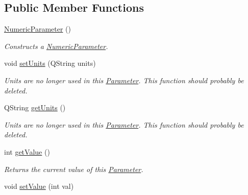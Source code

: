\subsection*{Public Member Functions}
\begin{DoxyCompactItemize}
\item 
\hyperlink{class_picto_1_1_numeric_parameter_a8115bd2ffae7f9a5b2db777ad606eee1}{Numeric\-Parameter} ()
\begin{DoxyCompactList}\small\item\em Constructs a \hyperlink{class_picto_1_1_numeric_parameter}{Numeric\-Parameter}. \end{DoxyCompactList}\item 
\hypertarget{class_picto_1_1_numeric_parameter_aa6545295af97b9260d75a93defbb22b8}{void \hyperlink{class_picto_1_1_numeric_parameter_aa6545295af97b9260d75a93defbb22b8}{set\-Units} (Q\-String units)}\label{class_picto_1_1_numeric_parameter_aa6545295af97b9260d75a93defbb22b8}

\begin{DoxyCompactList}\small\item\em Units are no longer used in this \hyperlink{class_picto_1_1_parameter}{Parameter}. This function should probably be deleted. \end{DoxyCompactList}\item 
\hypertarget{class_picto_1_1_numeric_parameter_a2709725f4142f06214bae4d7d38cc683}{Q\-String \hyperlink{class_picto_1_1_numeric_parameter_a2709725f4142f06214bae4d7d38cc683}{get\-Units} ()}\label{class_picto_1_1_numeric_parameter_a2709725f4142f06214bae4d7d38cc683}

\begin{DoxyCompactList}\small\item\em Units are no longer used in this \hyperlink{class_picto_1_1_parameter}{Parameter}. This function should probably be deleted. \end{DoxyCompactList}\item 
\hypertarget{class_picto_1_1_numeric_parameter_a633886f712afb51964363a379fcb6e7e}{int \hyperlink{class_picto_1_1_numeric_parameter_a633886f712afb51964363a379fcb6e7e}{get\-Value} ()}\label{class_picto_1_1_numeric_parameter_a633886f712afb51964363a379fcb6e7e}

\begin{DoxyCompactList}\small\item\em Returns the current value of this \hyperlink{class_picto_1_1_parameter}{Parameter}. \end{DoxyCompactList}\item 
\hypertarget{class_picto_1_1_numeric_parameter_a99292e7d51401b4233d4237dee219280}{void \hyperlink{class_picto_1_1_numeric_parameter_a99292e7d51401b4233d4237dee219280}{set\-Value} (int val)}\label{class_picto_1_1_numeric_parameter_a99292e7d51401b4233d4237dee219280}


\end{DoxyCompactItemize}
